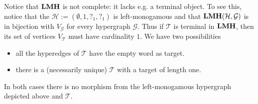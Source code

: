 \documentclass[3p]{elsarticle}
\newcommand{\catname}[1]{\textbf{\textup{#1}}}
\newcommand{\lmo}{\catname{LMH}}
\theoremstyle{remark}
\theoremstyle{definition}
\begin{document}
\begin{rem}\label{rem:con}Notice that  $\lmo$ is not complete: it lacks e.g. a terminal object. To see this, notice that the $\mathcal{H}:=(\emptyset, 1, ?_{1}, ?_{1} )$ is left-monogamous and that 
	$\lmo(\mathcal{H}, \mathcal{G})$ is in bijection with $V_{\mathcal{G}}$ for every hypergraph $\mathcal{G}$. Thus if  $\mathcal{T}$ is terminal in $\lmo$, then its set of vertices $V_{\mathcal{T}}$ must have cardinality $1$.  We have two possibilities	

\vspace{.1cm}
	\begin{minipage}[l]{.65\linewidth}
		\begin{itemize}
			\item  all the hyperedges of $\mathcal{T}$ have the empty word as target.
			\item there is a (necessarily unique) $\mathcal{T}$ with a target of length one.
		\end{itemize}
	\end{minipage}
	\begin{minipage}[r]{.15\linewidth}
	\end{minipage}
	
\vspace{.1cm}
\noindent
In both cases there is no morphism from the left-monogamous hypergraph depicted above and $\mathcal{T}$. 
\end{rem}
\end{document}
